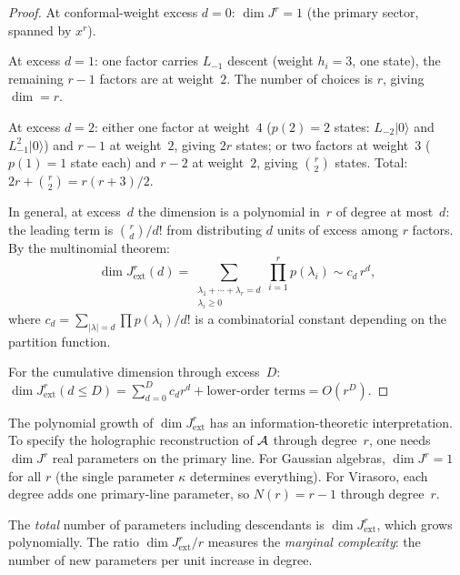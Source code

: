 \begin{proof}
At conformal-weight excess $d = 0$: $\dim J^r = 1$
(the primary sector, spanned by $x^r$).

At excess $d = 1$: one factor carries
$L_{-1}$ descent (weight $h_i = 3$, one state), the
remaining $r - 1$ factors are at weight~$2$. The number
of choices is $r$, giving $\dim = r$.

At excess $d = 2$: either one factor at weight~$4$
($p(2) = 2$ states: $L_{-2}|0\rangle$ and $L_{-1}^2|0\rangle$)
and $r - 1$ at weight~$2$, giving $2r$ states; or
two factors at weight~$3$ ($p(1) = 1$ state each)
and $r - 2$ at weight~$2$, giving $\binom{r}{2}$ states.
Total: $2r + \binom{r}{2} = r(r+3)/2$.

In general, at excess~$d$ the dimension is a polynomial
in~$r$ of degree at most~$d$: the leading term is
$\binom{r}{d}/d!$ from distributing $d$ units of excess
among $r$ factors. By the multinomial theorem:
\begin{equation}\label{eq:extended-dimension-polynomial}
\dim J^r_{\mathrm{ext}}(d)
= \sum_{\substack{\lambda_1 + \cdots + \lambda_r = d \\
\lambda_i \geq 0}}
\prod_{i=1}^r p(\lambda_i)
\sim c_d\,r^d,
\end{equation}
where $c_d = \sum_{|\lambda| = d} \prod p(\lambda_i) / d!$
is a combinatorial constant depending on the partition
function.

For the cumulative dimension through excess~$D$:
$\dim J^r_{\mathrm{ext}}(d \leq D) = \sum_{d=0}^D
c_d r^d + \text{lower-order terms} = O(r^D)$.
\end{proof}

\begin{remark}
\label{rem:information-content}
The polynomial growth of $\dim J^r_{\mathrm{ext}}$
has an information-theoretic interpretation. To specify the
holographic reconstruction of $\mathcal{A}$ through degree~$r$,
one needs $\dim J^r$ real parameters on the primary line.
For Gaussian algebras, $\dim J^r = 1$ for all $r$ (the
single parameter $\kappa$ determines everything). For
Virasoro, each degree adds one primary-line parameter,
so $N(r) = r - 1$ through degree~$r$.

The \emph{total} number of parameters including descendants
is $\dim J^r_{\mathrm{ext}}$, which grows polynomially.
The ratio $\dim J^r_{\mathrm{ext}} / r$ measures the
\emph{marginal complexity}: the number of new parameters
per unit increase in degree.
\end{remark}

